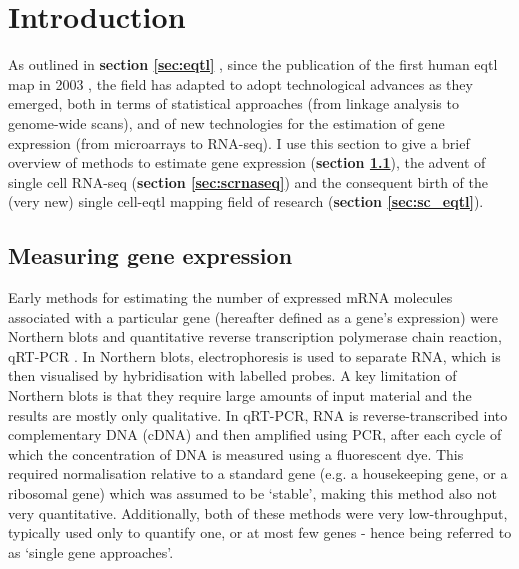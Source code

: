\newpage

\section{Introduction}

As outlined in \textbf{section 
\ref{sec:eqtl}} ,
since the publication of the first human \gls{eqtl} map in 2003 \cite{schadt2003genetics}, the field has adapted to adopt technological advances as they emerged, both in terms of statistical approaches (from linkage analysis to genome-wide scans), and of new technologies for the estimation of gene expression (from microarrays to RNA-seq).
I use this section to give a brief overview of methods to estimate gene expression (\textbf{section \ref{sec:gene_expression}}), the advent of single cell RNA-seq (\textbf{section \ref{sec:scrnaseq}}) and the consequent birth of the (very new) single cell-\gls{eqtl} mapping field of research (\textbf{section \ref{sec:sc_eqtl}}). 

\subsection{Measuring gene expression}
\label{sec:gene_expression}

Early methods for estimating the number of expressed mRNA molecules associated with a particular gene (hereafter defined as a gene's expression)
were Northern blots \cite{alwine1977method} and quantitative reverse transcription polymerase chain reaction, qRT-PCR \cite{gibson1996novel}. 
In Northern blots, electrophoresis is used to separate RNA, which is then visualised by hybridisation with labelled probes. 
A key limitation of Northern blots is that they require large amounts of input material and the results are mostly only qualitative.
In qRT-PCR, RNA is reverse-transcribed into complementary DNA (cDNA) and then amplified using PCR, after each cycle of which the concentration of DNA is measured using a fluorescent dye. 
This required normalisation relative to a standard gene (e.g. 
a housekeeping gene, or 
a ribosomal gene) which was assumed to be `stable', making this method also not very quantitative.
Additionally, both of these methods were very low-throughput, typically used only to quantify one, or at most few genes - hence being referred to as `single gene approaches'.
\\

